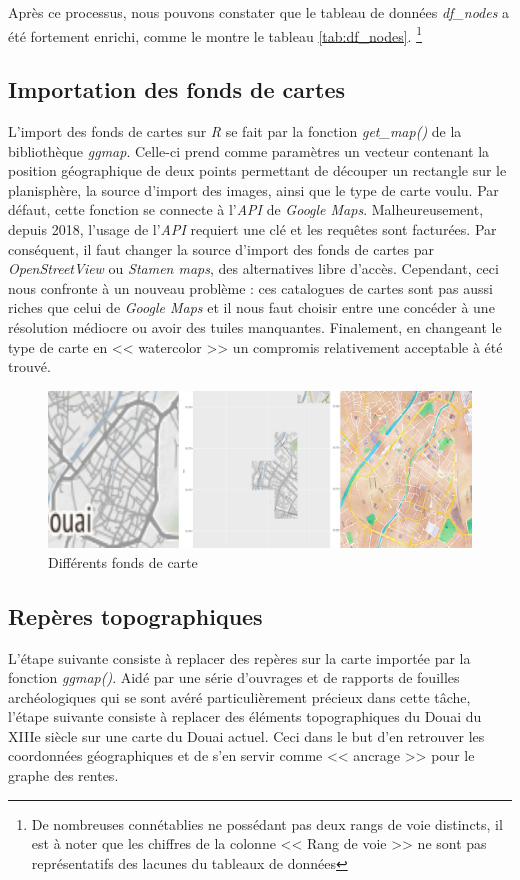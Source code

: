 Après ce processus, nous pouvons constater que le tableau de données \textit{df\_nodes} a été fortement enrichi, comme le montre le tableau \ref{tab:df_nodes}.
\footnote{De nombreuses connétablies ne possédant pas deux rangs de voie distincts, il est à noter que les chiffres de la colonne << Rang de voie >> ne sont pas représentatifs des lacunes du tableaux de données }

\subsection{Importation des fonds de cartes}
L'import des fonds de cartes sur \textit{R}  se fait par la fonction \textit{get\_map()} de la bibliothèque \textit{ggmap}. 
Celle-ci prend comme paramètres un vecteur contenant la position géographique de deux points permettant de découper un rectangle sur le planisphère, la source d'import des images, ainsi que le type de carte voulu.
Par défaut, cette fonction se connecte à l'\textit{API} de \textit{Google Maps}. Malheureusement, depuis 2018,  l'usage de l'\textit{API} requiert une clé  et les requêtes sont facturées. Par conséquent, il faut changer la source d'import des fonds de cartes par \textit{OpenStreetView} ou \textit{Stamen maps}, des alternatives libre d'accès. Cependant, ceci nous confronte à un nouveau problème : ces  catalogues de cartes sont pas aussi riches que celui de \textit{Google Maps} et il nous faut choisir entre une  concéder à une résolution médiocre ou  avoir des tuiles manquantes. Finalement, en changeant le type de carte en <<  watercolor  >> un compromis relativement acceptable à été trouvé.

\begin{figure}
    \centering
    \includegraphics[scale=0.4]{3.Results/Img/maps.png}
    \caption{Différents fonds de carte}
    \label{fig:maps}
\end{figure}

\subsection{Repères topographiques}
L'étape suivante consiste à replacer des repères sur la carte importée par la fonction \textit{ggmap()}.
Aidé par une série d'ouvrages et de rapports de fouilles archéologiques  qui se sont avéré particulièrement précieux dans cette tâche, l'étape suivante consiste à replacer des éléments topographiques du Douai du XIIIe siècle sur une carte du Douai actuel. Ceci dans le but d'en retrouver les coordonnées géographiques et de s'en servir comme <<  ancrage  >> pour le graphe des rentes.

